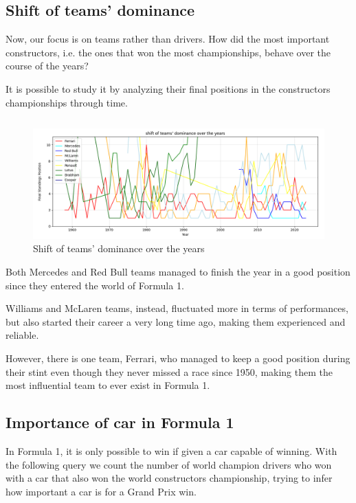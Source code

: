 \documentclass{Configuration_Files/PoliMi3i_thesis}
\begin{document}
\subsection{Shift of teams' dominance}
Now, our focus is on teams rather than drivers. How did the most important constructors, i.e. the ones that won the most championships, behave over the course of the years?

It is possible to study it by analyzing their final positions in the constructors championships through time.

\vspace{0.5cm}
\inputminted[frame=single,framesep=10pt,breaklines]{python}{formula1/queries/query8.py}

\newpage
\begin{figure}[!h]
  \centering
  \includegraphics[width=\textwidth]{latex/formula1/visualization/query8.png}
  \caption{Shift of teams' dominance over the years}
  \label{fig:releases}
\end{figure}

Both Mercedes and Red Bull teams managed to finish the year in a good position since they entered the world of Formula 1.

Williams and McLaren teams, instead, fluctuated more in terms of performances, but also started their career a very long time ago, making them experienced and reliable.

However, there is one team, Ferrari, who managed to keep a good position during their stint even though they never missed a race since 1950, making them the most influential team to ever exist in Formula 1.


\subsection{Importance of car in Formula 1}
In Formula 1, it is only possible to win if given a car capable of winning. With the following query we count the number of world champion drivers who won with a car that also won the world constructors championship, trying to infer how important a car is for a Grand Prix win.
\end{document}
